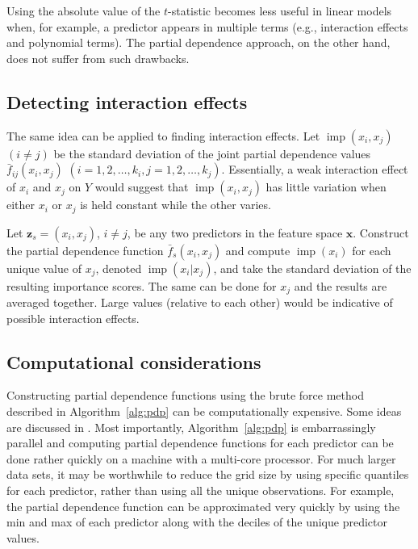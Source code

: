 \documentclass[12pt]{article}
\DeclareMathOperator{\imp}{imp}
\begin{document}
Using the absolute value of the $t$-statistic becomes less useful in linear models when, for example, a predictor appears in multiple terms (e.g., interaction effects and polynomial terms). The partial dependence approach, on the other hand, does not suffer from such drawbacks.


\subsection{Detecting interaction effects}
\label{sec:interaction}

The same idea can be applied to finding interaction effects. Let $\imp\left(x_i, x_j\right)$ $\left(i \ne j\right)$ be the standard deviation of the joint partial dependence values $\bar{f}_{ij}\left(x_i, x_j\right)$ $\left(i = 1, 2, \dots, k_i, j = 1, 2, \dots, k_j\right)$. Essentially, a weak interaction effect of $x_i$ and $x_j$ on $Y$ would suggest that $\imp\left(x_i, x_j\right)$ has little variation when either $x_i$ or $x_j$ is held constant while the other varies. 

Let $\boldsymbol{z}_s = \left(x_i, x_j\right)$, $i \neq j$, be any two predictors in the feature space $\boldsymbol{x}$. Construct the partial dependence function $\bar{f}_s\left(x_i, x_j\right)$ and compute $\imp\left(x_i\right)$ for each unique value of $x_j$, denoted $\imp\left(x_i | x_j\right)$, and take the standard deviation of the resulting importance scores. The same can be done for $x_j$ and the results are averaged together. Large values (relative to each other) would be indicative of possible interaction effects. 


\subsection{Computational considerations}

Constructing partial dependence functions using the brute force method described in Algorithm~\eqref{alg:pdp} can be computationally expensive. Some ideas are discussed in \citet{pdp-greenwell-2017}. Most importantly, Algorithm~\eqref{alg:pdp} is embarrassingly parallel and computing partial dependence functions for each predictor can be done rather quickly on a machine with a multi-core processor. For much larger data sets, it may be worthwhile to reduce the grid size by using specific quantiles for each predictor, rather than using all the unique observations. For example, the partial dependence function can be approximated very quickly by using the min and max of each predictor along with the deciles of the unique predictor values.
\end{document}
